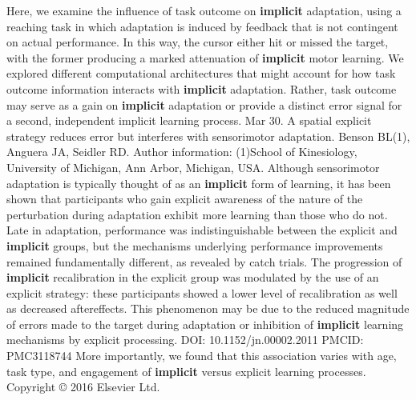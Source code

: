 \documentclass[11pt]{article}
\begin{document}
\newline  [  67  ]   Here, we examine the influence of task outcome on   \textbf {  implicit  }    adaptation, using a reaching task in which adaptation is induced by feedback  that is not contingent on actual performance.
\newline  [  68  ]   In  this way, the cursor either hit or missed the target, with the former producing  a marked attenuation of   \textbf {  implicit  }   motor learning.
\newline  [  69  ]   We explored different  computational architectures that might account for how task outcome information  interacts with   \textbf {  implicit  }   adaptation.
\newline  [  70  ]   Rather, task outcome may serve as a gain on   \textbf {  implicit  }   adaptation or  provide a distinct error signal for a second, independent implicit learning  process.
\newline  [  71  ]  Mar 30.  A spatial explicit strategy reduces error but interferes with sensorimotor  adaptation.  Benson BL(1), Anguera JA, Seidler RD.  Author information: (1)School of Kinesiology, University of Michigan, Ann Arbor, Michigan, USA.  Although sensorimotor adaptation is typically thought of as an   \textbf {  implicit  }   form of  learning, it has been shown that participants who gain explicit awareness of the  nature of the perturbation during adaptation exhibit more learning than those  who do not.
\newline  [  72  ]   Late in  adaptation, performance was indistinguishable between the explicit and   \textbf {  implicit  }    groups, but the mechanisms underlying performance improvements remained  fundamentally different, as revealed by catch trials.
\newline  [  73  ]   The progression of    \textbf {  implicit  }   recalibration in the explicit group was modulated by the use of an  explicit strategy: these participants showed a lower level of recalibration as  well as decreased aftereffects.
\newline  [  74  ]   This phenomenon may be due to the reduced  magnitude of errors made to the target during adaptation or inhibition of    \textbf {  implicit  }   learning mechanisms by explicit processing.  DOI: 10.1152/jn.00002.2011 PMCID: PMC3118744
\newline  [  75  ]   More importantly, we found that this association varies  with age, task type, and engagement of   \textbf {  implicit  }   versus explicit learning  processes.  Copyright © 2016 Elsevier Ltd.
\end{document}
